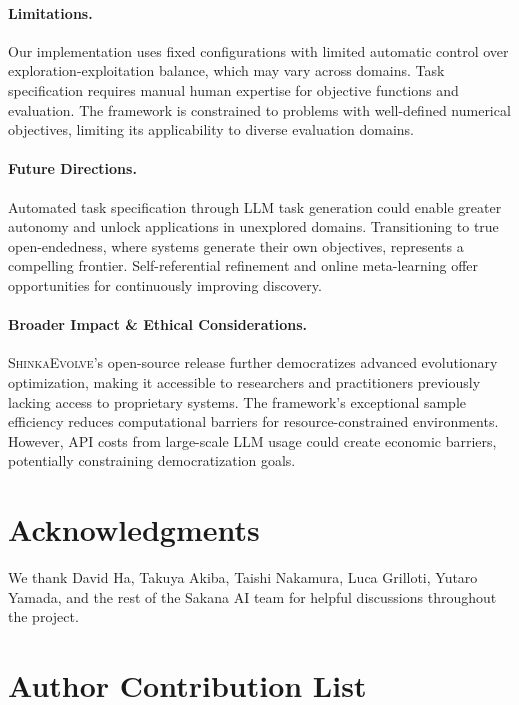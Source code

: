 \documentclass[11pt, a4paper]{include/gdm_format}
\newcommand{\ouralgo}{\textsc{ShinkaEvolve}\xspace}
\begin{document}
\paragraph{Limitations.}
Our implementation uses fixed configurations with limited automatic control over exploration-exploitation balance, which may vary across domains.
Task specification requires manual human expertise for objective functions and evaluation.
The framework is constrained to problems with well-defined numerical objectives, limiting its applicability to diverse evaluation domains.

\paragraph{Future Directions.}
Automated task specification through LLM task generation could enable greater autonomy and unlock applications in unexplored domains.
Transitioning to true open-endedness, where systems generate their own objectives, represents a compelling frontier.
Self-referential refinement and online meta-learning offer opportunities for continuously improving discovery.

\paragraph{Broader Impact \& Ethical Considerations.}
\ouralgo's open-source release further democratizes advanced evolutionary optimization, making it accessible to researchers and practitioners previously lacking access to proprietary systems.
The framework's exceptional sample efficiency reduces computational barriers for resource-constrained environments.
However, API costs from large-scale LLM usage could create economic barriers, potentially constraining democratization goals.


\newpage
\section*{Acknowledgments}

We thank David Ha, Takuya Akiba, Taishi Nakamura, Luca Grilloti, Yutaro Yamada, and the rest of the Sakana AI team for helpful discussions throughout the project.

\section*{Author Contribution List}
\label{sec:author_contribution_list}
\end{document}
